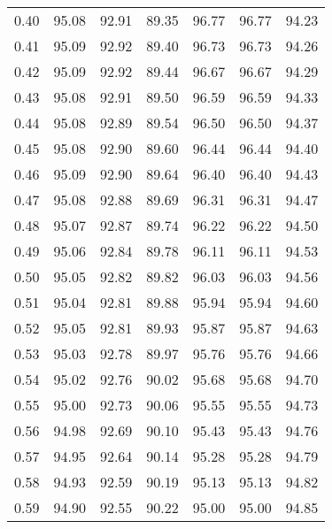 \begin{tabular}{|c|c|c|c|c|c|c|}
      0.40 &     95.08 &     92.91 &      89.35 &   96.77 &      96.77 &         94.23 \\
      0.41 &     95.09 &     92.92 &      89.40 &   96.73 &      96.73 &         94.26 \\
      0.42 &     95.09 &     92.92 &      89.44 &   96.67 &      96.67 &         94.29 \\
      0.43 &     95.08 &     92.91 &      89.50 &   96.59 &      96.59 &         94.33 \\
      0.44 &     95.08 &     92.89 &      89.54 &   96.50 &      96.50 &         94.37 \\
      0.45 &     95.08 &     92.90 &      89.60 &   96.44 &      96.44 &         94.40 \\
      0.46 &     95.09 &     92.90 &      89.64 &   96.40 &      96.40 &         94.43 \\
      0.47 &     95.08 &     92.88 &      89.69 &   96.31 &      96.31 &         94.47 \\
      0.48 &     95.07 &     92.87 &      89.74 &   96.22 &      96.22 &         94.50 \\
      0.49 &     95.06 &     92.84 &      89.78 &   96.11 &      96.11 &         94.53 \\
      0.50 &     95.05 &     92.82 &      89.82 &   96.03 &      96.03 &         94.56 \\
      0.51 &     95.04 &     92.81 &      89.88 &   95.94 &      95.94 &         94.60 \\
      0.52 &     95.05 &     92.81 &      89.93 &   95.87 &      95.87 &         94.63 \\
      0.53 &     95.03 &     92.78 &      89.97 &   95.76 &      95.76 &         94.66 \\
      0.54 &     95.02 &     92.76 &      90.02 &   95.68 &      95.68 &         94.70 \\
      0.55 &     95.00 &     92.73 &      90.06 &   95.55 &      95.55 &         94.73 \\
      0.56 &     94.98 &     92.69 &      90.10 &   95.43 &      95.43 &         94.76 \\
      0.57 &     94.95 &     92.64 &      90.14 &   95.28 &      95.28 &         94.79 \\
      0.58 &     94.93 &     92.59 &      90.19 &   95.13 &      95.13 &         94.82 \\
      0.59 &     94.90 &     92.55 &      90.22 &   95.00 &      95.00 &         94.85 \\

\end{tabular}
